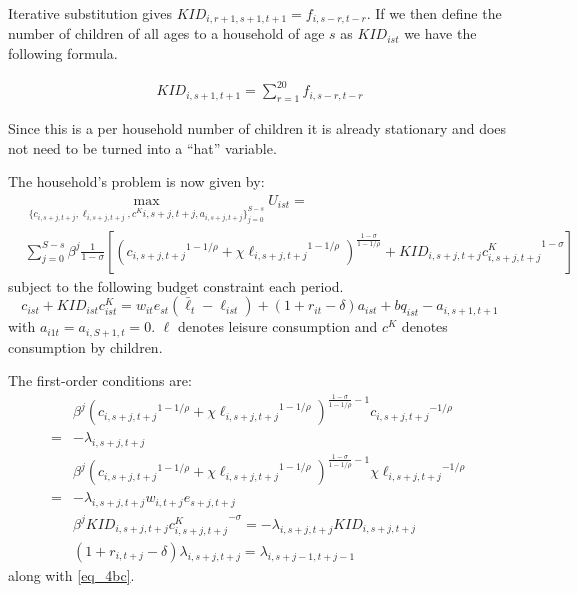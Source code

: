 \documentclass[letterpaper,12pt]{article}
\theoremstyle{definition}
\numberwithin{equation}{section}
\begin{document}
\begin{spacing}{1.5}
	Iterative substitution gives $KID_{i,r+1,s+1,t+1} = f_{i,s-r,t-r}$.  If we then define the number of children of all ages to a household of age $s$ as $KID_{ist}$ we have the following formula.

	\begin{align}
		KID_{i,s+1,t+1} = \sum_{r=1}^{20} f_{i,s-r,t-r}
	\end{align}

	Since this is a per household number of children it is already stationary and does not need to be turned into a ``hat'' variable.

	The household's problem is now given by:
	\begin{equation}
		\begin{split}
		& \max_{\{c_{i,s+j,t+j},\ell_{i,s+j,t+j},c^K{i,s+j,t+j},a_{i,s+j,t+j}\}_{j=0}^{S-s}} U_{ist} = \\
		& \sum_{j=0}^{S-s} \beta^j \frac{1}{1-\sigma} \left[ \left( {c_{i,s+j,t+j}}^{1-1/\rho} + \chi {\ell_{i,s+j,t+j}}^{1-1/\rho}\right)^{\tfrac{{1-\sigma}}{1-1/\rho}} + KID_{i,s+j,t+j}{c^K_{i,s+j,t+j}}^{1-\sigma}\right] \nonumber
		\end{split}
	\end{equation}
	subject to the following budget constraint each period.
	\begin{equation} \label{eq_4bc}
		c_{ist} + KID_{ist}c^K_{ist} = w_{it} e_{st} (\bar \ell_t -\ell_{ist}) + (1+r_{it}-\delta)a_{ist} + bq_{ist} - a_{i,s+1,t+1}
	\end{equation}
	with $a_{i1t} = a_{i,S+1,t} = 0$.  $\ell$ denotes leisure consumption and $c^K$ denotes consumption by children.

	The first-order conditions are:
	\begin{align}
		& \beta^j \left( {c_{i,s+j,t+j}}^{1-1/\rho} + \chi {\ell_{i,s+j,t+j}}^{1-1/\rho}\right)^{\tfrac{{1-\sigma}}{1-1/\rho}-1} {c_{i,s+j,t+j}}^{-1/\rho}  \nonumber \\ = &  - \lambda_{i,s+j,t+j}  \label{eq_4foc1} \\
		& \beta^j \left( {c_{i,s+j,t+j}}^{1-1/\rho} + \chi {\ell_{i,s+j,t+j}}^{1-1/\rho}\right)^{\tfrac{{1-\sigma}}{1-1/\rho}-1} \chi {\ell_{i,s+j,t+j}}^{-1/\rho} \nonumber \\ = & - \lambda_{i,s+j,t+j} w_{i,t+j} e_{s+j,t+j} \label{eq_4foc2} \\
		& \beta^j KID_{i,s+j,t+j}{c^K_{i,s+j,t+j}}^{-\sigma} = - \lambda_{i,s+j,t+j} KID_{i,s+j,t+j} \label{eq_4foc3} \\
               & (1+r_{i,t+j}-\delta) \lambda_{i,s+j,t+j} = \lambda_{i,s+j-1,t+j-1} \label{eq_4foc4}
	\end{align}	
	along with \eqref{eq_4bc}.


\end{spacing}
\end{document}
